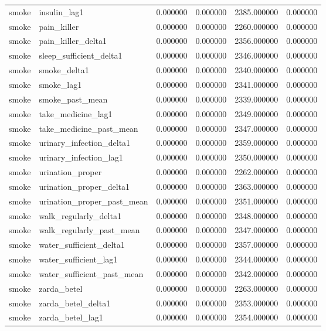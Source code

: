 \begin{longtable}{llrrrr}
smoke & insulin\_lag1 & 0.000000 & 0.000000 & 2385.000000 & 0.000000 \\
smoke & pain\_killer & 0.000000 & 0.000000 & 2260.000000 & 0.000000 \\
smoke & pain\_killer\_delta1 & 0.000000 & 0.000000 & 2356.000000 & 0.000000 \\
smoke & sleep\_sufficient\_delta1 & 0.000000 & 0.000000 & 2346.000000 & 0.000000 \\
smoke & smoke\_delta1 & 0.000000 & 0.000000 & 2340.000000 & 0.000000 \\
smoke & smoke\_lag1 & 0.000000 & 0.000000 & 2341.000000 & 0.000000 \\
smoke & smoke\_past\_mean & 0.000000 & 0.000000 & 2339.000000 & 0.000000 \\
smoke & take\_medicine\_lag1 & 0.000000 & 0.000000 & 2349.000000 & 0.000000 \\
smoke & take\_medicine\_past\_mean & 0.000000 & 0.000000 & 2347.000000 & 0.000000 \\
smoke & urinary\_infection\_delta1 & 0.000000 & 0.000000 & 2359.000000 & 0.000000 \\
smoke & urinary\_infection\_lag1 & 0.000000 & 0.000000 & 2350.000000 & 0.000000 \\
smoke & urination\_proper & 0.000000 & 0.000000 & 2262.000000 & 0.000000 \\
smoke & urination\_proper\_delta1 & 0.000000 & 0.000000 & 2363.000000 & 0.000000 \\
smoke & urination\_proper\_past\_mean & 0.000000 & 0.000000 & 2351.000000 & 0.000000 \\
smoke & walk\_regularly\_delta1 & 0.000000 & 0.000000 & 2348.000000 & 0.000000 \\
smoke & walk\_regularly\_past\_mean & 0.000000 & 0.000000 & 2347.000000 & 0.000000 \\
smoke & water\_sufficient\_delta1 & 0.000000 & 0.000000 & 2357.000000 & 0.000000 \\
smoke & water\_sufficient\_lag1 & 0.000000 & 0.000000 & 2344.000000 & 0.000000 \\
smoke & water\_sufficient\_past\_mean & 0.000000 & 0.000000 & 2342.000000 & 0.000000 \\
smoke & zarda\_betel & 0.000000 & 0.000000 & 2263.000000 & 0.000000 \\
smoke & zarda\_betel\_delta1 & 0.000000 & 0.000000 & 2353.000000 & 0.000000 \\
smoke & zarda\_betel\_lag1 & 0.000000 & 0.000000 & 2354.000000 & 0.000000 \\

\end{longtable}
